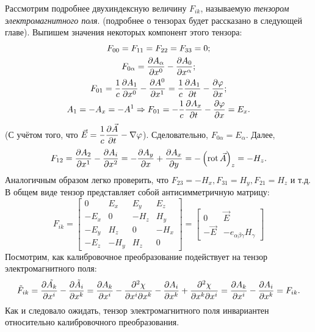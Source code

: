     Рассмотрим подробнее двухиндексную величину $F_{ik}$, называемую \textit{тензором электромагнитного поля}. (подробнее о тензорах будет
    рассказано в следующей главе). Выпишем значения некоторых компонент этого тензора:
    \begin{gather*}
        F_{00} = F_{11} = F_{22} = F_{33} = 0;\\
        F_{0\alpha} = \frac{\partial A_{\alpha}}{\partial x^0} - \frac{\partial A_0}{\partial x^{\alpha}};\\
        F_{01} = \frac 1c \frac{\partial A_1}{\partial x^0} - \frac{\partial A^0}{\partial x^ 1} = \frac 1c \frac{\partial A_1}{\partial t} - \frac{\partial\varphi}{\partial x};\\
        A_1 = -A_x = -A^1 \Rightarrow F_{01} = -\frac{1}{c} \frac{\partial A_x}{\partial t} - \frac{\partial\varphi}{\partial x} = E_x.
    \end{gather*}
    (С учётом того, что $\displaystyle \vec{E} = \frac 1c \frac{\partial\vec{A}}{\partial t} - \nabla\varphi$). Сделовательно, $\displaystyle F_{0\alpha} = E_{\alpha}$. Далее,
    \[
        F_{12} = \frac{\partial A_2}{\partial x^1} - \frac{\partial A_i}{\partial x^2} = -\frac{\partial A_y}{\partial x} + \frac{\partial A_x}{\partial y} = -\left({\operatorname{rot}\vec{A}}\right)_z = -H_z. \\
    \]
    Аналогичным образом легко проверить, что $F_{23} = -H_x, F_{31} = H_y, F_{21} = H_z$ и т.д. В общем виде тензор представляет собой
    антисимметричную матрицу:
    \[
        F_{ik} = \begin{bmatrix}
            0 & E_x & E_y & E_z \\
            -E_x & 0 & -H_z & H_y \\
            -E_y & H_z & 0 & -H_x \\
            -E_z & -H_y & H_z & 0
        \end{bmatrix}
        = 
        \begin{bmatrix}
            0 & \vec{E} \\
            -\vec{E} &  -e_{\alpha\beta\gamma}H_{\gamma}
        \end{bmatrix}
    \]
    Посмотрим, как калибровочное преобразование подействует на тензор электромагнитного поля:
    \[
        \tilde{F}_{ik} = \frac{\partial\tilde{A_k}}{\partial x^i} - \frac{\partial\tilde{A_i}}{\partial x^k} = \frac{\partial A_k}{\partial x^i} -
        \frac{\partial^2\chi}{\partial x^i\partial x^k} - \frac{\partial A_i}{\partial x^k} + \frac{\partial^2\chi}{\partial x^k\partial x^i} = 
        \frac{\partial A_k}{\partial x^i} - \frac{\partial A_i}{\partial x^k} = F_{ik}.
    \]
    Как и следовало ожидать, тензор электромагнитного поля инвариантен относительно калибровочного преобразования.

